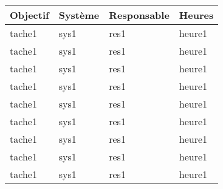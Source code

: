 \begin{tabularx}{\linewidth}{
    |>{\hsize=2.5\hsize}X|%
    >{\hsize=0.5\hsize}X|%
    >{\hsize=0.75\hsize}X|%
    >{\hsize=0.25\hsize}X|%
  }
    \hline
    \textbf{Objectif} & \textbf{Système} & \textbf{Responsable} & \textbf{Heures}\\\hline
    tache1 & sys1 & res1 & heure1\\\hline
    tache1 & sys1 & res1 & heure1\\\hline
    tache1 & sys1 & res1 & heure1\\\hline
    tache1 & sys1 & res1 & heure1\\\hline
    tache1 & sys1 & res1 & heure1\\\hline
    tache1 & sys1 & res1 & heure1\\\hline
    tache1 & sys1 & res1 & heure1\\\hline
    tache1 & sys1 & res1 & heure1\\\hline
    tache1 & sys1 & res1 & heure1\\\hline
  \end{tabularx}
     